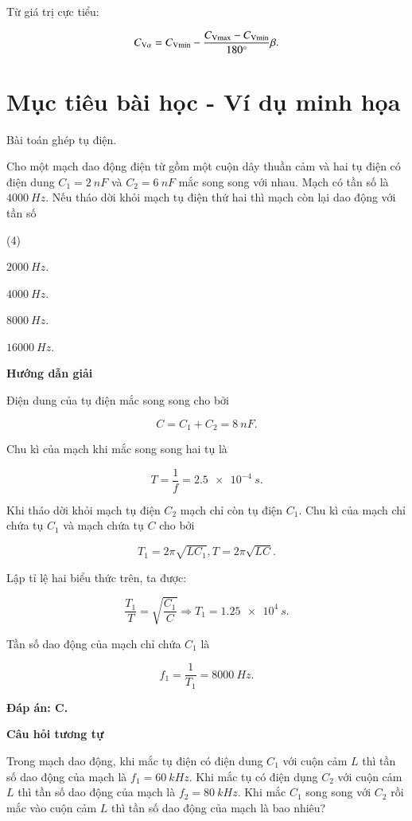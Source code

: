 Từ giá trị cực tiểu:

$$C_{\text V{\alpha}}= C_\text{V\text{min}} - \dfrac{C_\text{V\text{max}}- C_\text{V\text{min}}}{180^\circ}\beta.$$


\section{Mục tiêu bài học - Ví dụ minh họa}
\begin{dang}{Bài toán ghép tụ điện.}
	{Cho một mạch dao động điện từ gồm một cuộn dây thuần cảm và hai tụ điện có điện dung $C_1 = \SI{2}{nF}$ và $C_2 = \SI{6}{nF}$ mắc song song với nhau. Mạch có tần số là $\SI{4000}{Hz}$. Nếu  tháo dời khỏi mạch tụ điện thứ hai thì mạch còn lại dao động với tần số
		\begin{mcq}(4)
			\item $\SI{2000}{Hz}$. 
			\item $\SI{4000}{Hz}$. 
			\item $\SI{8000}{Hz}$. 
			\item $\SI{16000}{Hz}$. 
		\end{mcq}
	}
	{	\begin{center}
			\textbf{Hướng dẫn giải}
		\end{center}
		
		Điện dung của tụ điện mắc song song cho bởi
		
		$$C=C_{1}+C_{2}= \SI{8}{nF}.$$
		
		Chu kì của mạch khi mắc song song hai tụ là
		
		$$T=\dfrac{1}{f}= \SI{2,5 e-4}{s}.$$
		
		Khi tháo dời khỏi mạch tụ điện $C_{2}$ mạch chỉ còn tụ điện $C_{1}$. Chu kì của mạch chỉ chứa tụ $C_{1}$ và mạch chứa tụ $C$ cho bởi
		
		$$T_{1} =2 \pi \sqrt{L C_{1}}, T =2 \pi \sqrt{L C}.$$
		
		Lập tỉ lệ hai biểu thức trên, ta được:
		
		$$\dfrac{T_{1}}{T}=\sqrt{\dfrac{C_{1}}{C}}\Rightarrow T_{1}= \SI{1,25 e4}{s}.$$
		
		Tần số dao động của mạch chỉ chứa $C_{1}$ là
		
		$$f_{1}=\dfrac{1}{T_{1}}= \SI{8000}{Hz}.$$	
		
		\textbf{Đáp án: C.}
		
		\begin{center}
			\textbf{Câu hỏi tương tự}
		\end{center}
		
		Trong mạch dao động, khi mắc tụ điện có điện dung $C_1$ với cuộn cảm $L$ thì tần số dao động của mạch là $f_1 = \SI{60}{kHz}$. Khi mắc tụ có điện dụng $C_2$ với cuộn cảm $L$ thì tần số dao động của mạch là $f_2 = \SI{80}{kHz}$. Khi mắc $C_1$ song song với $C_2$ rồi mắc vào cuộn cảm $L$ thì tần số dao động của mạch là bao nhiêu?
		
}
\end{dang}
